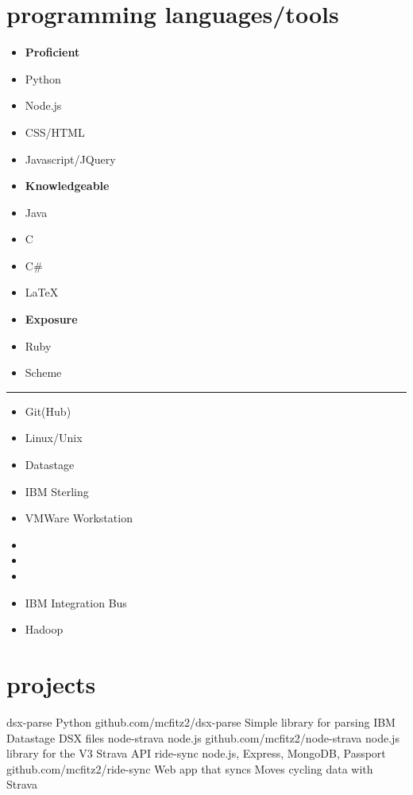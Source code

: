 \documentclass[]{friggeri-cv} %
\begin{document}
\section{programming languages/tools}
\vspace{-0.3cm}
\begin{multicols}{3}
 \begin{itemize}[noitemsep,nolistsep]
     \item[] \textbf{Proficient}
     \item[] Python
     \item[] Node.js
     \item[] CSS/HTML
     \item[] Javascript/JQuery
     \item[] \textbf{Knowledgeable }
     \item[] Java
     \item[] C
     \item[] C\#
     \item[] \LaTeX
     \item[] \textbf{Exposure}
     \item[] Ruby
     \item[] Scheme
 \end{itemize}
\end{multicols}
\vspace{-0.5cm}
\textcolor{lightgray}{\rule{15cm}{0.3pt}}
\begin{multicols}{3}
 \begin{itemize}[noitemsep,nolistsep]
     \item[] Git(Hub)
     \item[] Linux/Unix
     \item[] Datastage
   	 \item[] IBM Sterling
     \item[] VMWare Workstation
     \item[] 
     \item[] 
     \item[] 
     \item[] IBM Integration Bus
     \item[] Hadoop
 
 \end{itemize}
\end{multicols}
\section{projects}
\vspace{-0.2cm}
 \begin{entrylist}
 \entry
     {dsx-parse}
     {Python}
     {github.com/mcfitz2/dsx-parse}
     {Simple library for parsing IBM Datastage DSX files}
     {}
     \entry
     {node-strava}
     {node.js}
     {github.com/mcfitz2/node-strava}
     {node.js library for the V3 Strava API}
     {}
    \entry
     {ride-sync}
     {node.js, Express, MongoDB, Passport}
     {github.com/mcfitz2/ride-sync}
     {Web app that syncs Moves cycling data with Strava}
     {}
 \end{entrylist}
\end{document}
